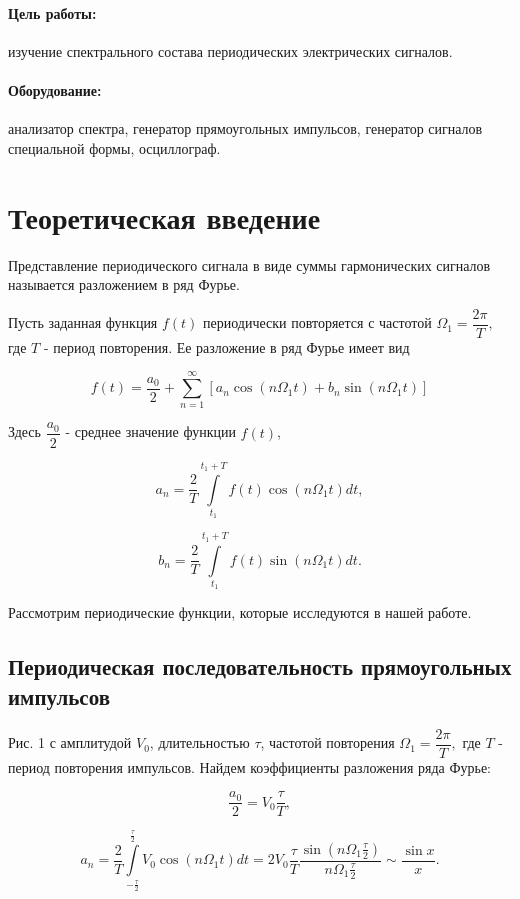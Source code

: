 \documentclass[a4paper, 14pt]{extarticle}%
\date{}
\begin{document}
\maketitle
\paragraph*{Цель работы:} изучение спектрального состава периодических электрических сигналов.
	
\paragraph*{Оборудование:} анализатор спектра, генератор прямоугольных импульсов, генератор сигналов специальной формы, осциллограф.
	
\section{Теоретическая введение}
	
	Представление периодического сигнала в виде суммы гармонических сигналов называется разложением в ряд Фурье.
	
	Пусть заданная функция $f(t)$ периодически повторяется с частотой $\Omega_{1}=\dfrac{2\pi}{T},$ где $T$ - период повторения. Ее разложение в ряд Фурье имеет вид
	
	$$ f(t)=\dfrac{a_{0}}{2}+ \sum\limits_{n=1}^\infty [a_{n}\cos(n \Omega_{1}t)+b_{n}\sin(n \Omega_{1} t) ]$$
	
	Здесь $\dfrac{a_{0}}{2}$ - среднее значение функции $f(t)$,
	
	$$ a_{n}=\dfrac{2}{T}\int\limits_{t_{1}}^{t_{1}+T}f(t)\cos(n \Omega_{1} t)dt, $$
	
	$$ b_{n}=\dfrac{2}{T}\int\limits_{t_{1}}^{t_{1}+T}f(t)\sin(n \Omega_{1} t)dt. $$
	
	
	Рассмотрим периодические функции, которые исследуются в нашей
	работе.
	
		
	\subsection{Периодическая последовательность прямоугольных импульсов} 
	Рис. 1 с амплитудой $V_{0}$, длительностью $\tau$, частотой повторения $\Omega_{1}=\dfrac{2\pi}{T},$ где $T$ - период повторения импульсов. Найдем коэффициенты разложения ряда Фурье:
	
	$$\dfrac{a_{0}}{2}=V_{0}\dfrac{\tau}{T},$$
	
	$$a_{n}=\dfrac{2}{T}\int\limits_{-\frac{\tau}{2}}^{\frac{\tau}{2}}V_{0}\cos(n \Omega_{1} t)dt=2V_{0}\dfrac{\tau}{T}\dfrac{\sin(n \Omega_{1} \frac{\tau}{2})}{n\Omega_{1}\frac{\tau}{2}} \sim \dfrac{\sin x}{x}.$$
	
\end{document}
